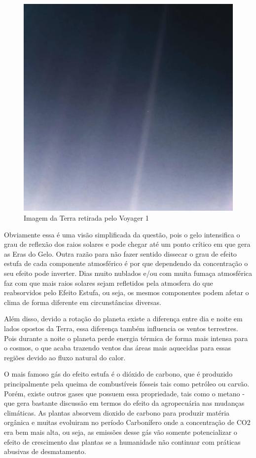 \begin{figure}[h]
    \centering
    \includegraphics[scale=0.25]{pictures/pale-blue-dot.jpg}
    \caption{Imagem da Terra retirada pelo Voyager 1}
    \label{geothermal-default}
\end{figure}

Obviamente essa é uma visão simplificada da questão, pois o gelo intensifica o grau de reflexão dos raios solares e pode chegar até um ponto crítico em que gera as Eras do Gelo. Outra razão para não fazer sentido dissecar o grau de efeito estufa de cada componente atmosférico é por que dependendo da concentração o seu efeito pode inverter. Dias muito nublados e/ou com muita fumaça atmosférica faz com que mais raios solares sejam refletidos pela atmosfera do que reabsorvidos pelo Efeito Estufa, ou seja, os mesmos componentes podem afetar o clima de forma diferente em circunstâncias diversas.

Além disso, devido a rotação do planeta existe a diferença entre dia e noite em lados opostos da Terra, essa diferença também influencia os ventos terrestres. Pois durante a noite o planeta perde energia térmica de forma mais intensa para o cosmos, o que acaba trazendo ventos das áreas mais aquecidas para essas regiões devido ao fluxo natural do calor.

O mais famoso gás do efeito estufa é o dióxido de carbono, que é produzido principalmente pela queima de combustíveis fósseis tais como petróleo ou carvão. Porém, existe outros gases que possuem essa propriedade, tais como o metano - que gera bastante discussão em termos do efeito da agropecuária nas mudanças climáticas. 
As plantas absorvem dioxido de carbono para produzir matéria orgânica e muitas evoluiram no período Carbonífero onde a concentração de CO2 era bem mais alta, ou seja, as emissões desse gás vão somente potencializar o efeito de crescimento das plantas se a humanidade não continuar com práticas abusivas de desmatamento.

